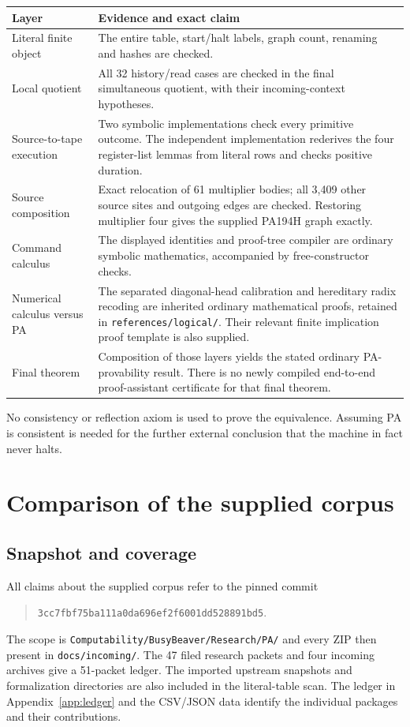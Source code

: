 \documentclass[11pt,letterpaper]{article}
\newcommand{\file}[1]{\nolinkurl{#1}}
\begin{document}
\begin{longtable}{p{}p{}}
\toprule Layer & Evidence and exact claim\\\midrule\endhead
Literal finite object & The entire table, start/halt labels, graph count,
renaming and hashes are checked.\\
Local quotient & All 32 history/read cases are checked in the final
simultaneous quotient, with their incoming-context hypotheses.\\
Source-to-tape execution & Two symbolic implementations check every
primitive outcome. The independent implementation rederives the four
register-list lemmas from literal rows and checks positive duration.\\
Source composition & Exact relocation of 61 multiplier bodies; all 3,409
other source sites and outgoing edges are checked. Restoring multiplier
four gives the supplied PA194H graph exactly.\\
Command calculus & The displayed identities and proof-tree compiler are
ordinary symbolic mathematics, accompanied by free-constructor checks.\\
Numerical calculus versus PA & The separated diagonal-head calibration and
hereditary radix recoding are inherited ordinary mathematical proofs,
retained in \file{references/logical/}. Their relevant finite implication
proof template is also supplied.\\
Final theorem & Composition of those layers yields the stated ordinary
PA-provability result. There is no newly compiled end-to-end proof-assistant
certificate for that final theorem.\\
\bottomrule
\end{longtable}
No consistency or reflection axiom is used to prove the equivalence. Assuming
PA is consistent is needed for the further external conclusion that the
machine in fact never halts.

\section{Comparison of the supplied corpus}
\label{sec:comparison}

\subsection{Snapshot and coverage}

All claims about the supplied corpus refer to the pinned commit
\begin{quote}\small\nolinkurl{3cc7fbf75ba111a0da696ef2f6001dd528891bd5}.\end{quote}
The scope is \file{Computability/BusyBeaver/Research/PA/} and every ZIP then
present in \file{docs/incoming/}. The 47 filed research packets and four
incoming archives give a 51-packet ledger. The imported upstream snapshots
and formalization directories are also included in the literal-table scan.
The ledger in Appendix~\ref{app:ledger} and the CSV/JSON data identify the
individual packages and their contributions.
\end{document}
